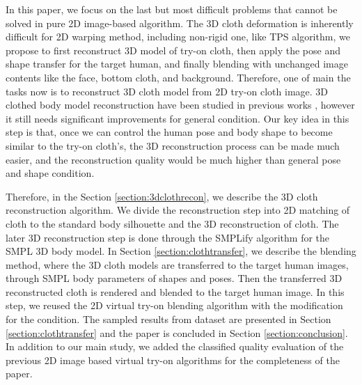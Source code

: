 In this paper, we focus on the last but most difficult problems that cannot be solved in pure 2D image-based algorithm. The 3D cloth deformation is inherently difficult for 2D warping method, including non-rigid one, like TPS algorithm, we propose to first reconstruct 3D model of try-on cloth, then apply the pose and shape transfer for the target human, and finally blending with unchanged image contents like the face, bottom cloth, and background. Therefore, one of main the tasks now is to reconstruct 3D cloth model from 2D try-on cloth image. 3D clothed body model reconstruction have been studied in previous works \cite{natsume2019siclope,saito2019pifu}, however it still needs significant improvements for general condition. Our key idea in this step is that, once we can control the human pose and body shape to become similar to the try-on cloth's, the 3D reconstruction process can be made much easier, and the reconstruction quality would be much higher than general pose and shape condition. 

Therefore, in the Section \ref{section:3dclothrecon}, we describe the 3D cloth reconstruction algorithm. We divide the reconstruction step into 2D matching of cloth to the standard body silhouette and the 3D reconstruction of cloth. The later 3D reconstruction step is done through the SMPLify\cite{Bogo2016SMPLify} algorithm for the SMPL 3D body model\cite{Loper2015SMPLAS}.  In Section \ref{section:clothtransfer}, we describe the blending method, where the 3D cloth models are transferred to the target human images, through SMPL body parameters of shapes and poses. Then the transferred 3D reconstructed cloth is rendered and blended to the target human image. In this step, we reused the 2D virtual try-on blending algorithm with the modification for the condition.  The sampled results from dataset are presented in Section \ref{section:clothtransfer} and the paper is concluded in Section \ref{section:conclusion}. In addition to our main study, we added the classified quality evaluation of the previous 2D image based virtual try-on algorithms for the completeness of the paper.


